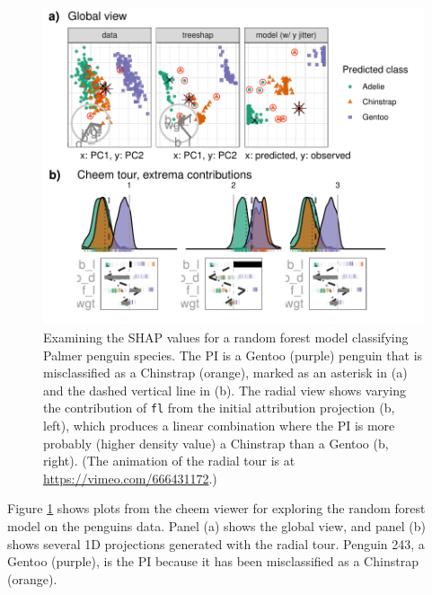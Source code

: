 \documentclass[11pt,twoside]{article}
\begin{document}
\begin{figure}

{\centering \includegraphics[width=1\linewidth]{./figures/case_penguins} 

}

\caption{Examining the SHAP values for a random forest model classifying Palmer penguin species. The PI is a Gentoo (purple) penguin that is misclassified as a Chinstrap (orange), marked as an asterisk in (a) and the dashed vertical line in (b). The radial view shows varying the contribution of \texttt{fl} from the initial attribution projection (b, left), which produces a linear combination where the PI is more probably (higher density value) a Chinstrap than a Gentoo (b, right). (The animation of the radial tour is at \url{https://vimeo.com/666431172}.)}\label{fig:casepenguins}
\end{figure}

Figure \ref{fig:casepenguins} shows plots from the cheem viewer for exploring the random forest model on the penguins data. Panel (a) shows the global view, and panel (b) shows several 1D projections generated with the radial tour. Penguin 243, a Gentoo (purple), is the PI because it has been misclassified as a Chinstrap (orange).
\end{document}
